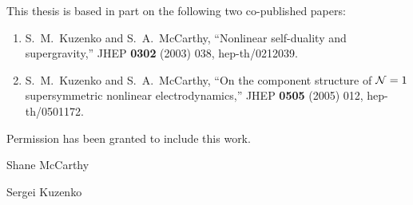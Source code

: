 \noindent This thesis is based in part on the following two co-published papers: 
\begin{enumerate}
\item S.~M.~Kuzenko and S.~A.~McCarthy,
``Nonlinear self-duality and supergravity,''
JHEP {\bf 0302} (2003) 038, hep-th/0212039.
\item   S.~M.~Kuzenko and S.~A.~McCarthy,
``On the component structure of \mbox{${\cal N}=1$} supersymmetric nonlinear electrodynamics,''
JHEP {\bf 0505} (2005) 012, hep-th/0501172.
\end{enumerate}
Permission has been granted to include this work.

\vskip3.0cm

Shane McCarthy

\vskip3.0cm

Sergei Kuzenko